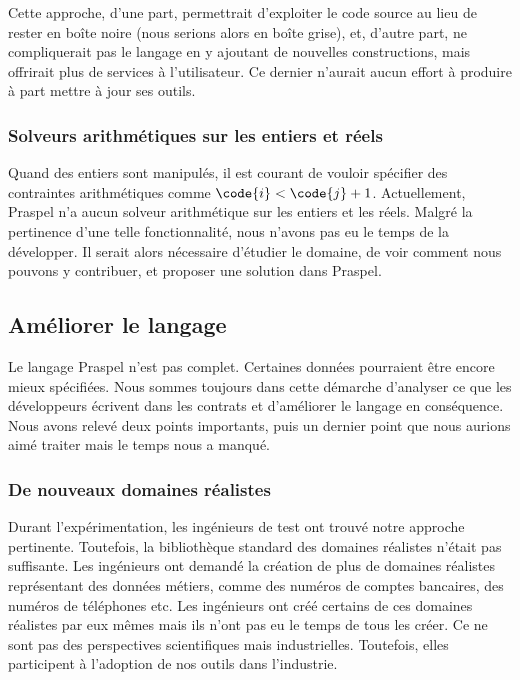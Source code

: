 Cette approche, d'une part, permettrait d'exploiter le code source au lieu de
rester en boîte noire (nous serions alors en boîte grise), et, d'autre part, ne
compliquerait pas le langage en y ajoutant de nouvelles constructions, mais
offrirait plus de services à l'utilisateur. Ce dernier n'aurait aucun effort à
produire à part mettre à jour ses outils.

\subsubsection{Solveurs arithmétiques sur les entiers et réels}

Quand des entiers sont manipulés, il est courant de vouloir spécifier des
contrain\-tes arithmétiques comme $\code{i} < \code{j} + 1$. Actuellement,
Praspel n'a aucun solveur arithmétique sur les entiers et les réels. Malgré la
pertinence d'une telle fonctionnalité, nous n'avons pas eu le temps de la
développer. Il serait alors nécessaire d'étudier le domaine, de voir comment
nous pouvons y contribuer, et proposer une solution dans Praspel.

\subsection{Améliorer le langage}

Le langage Praspel n'est pas complet. Certaines données pourraient être encore
mieux spécifiées. Nous sommes toujours dans cette démarche d'analyser ce que les
développeurs écrivent dans les contrats et d'améliorer le langage en
conséquence. Nous avons relevé deux points importants, puis un dernier point que
nous aurions aimé traiter mais le temps nous a manqué.

\subsubsection{De nouveaux domaines réalistes}

Durant l'expérimentation, les ingénieurs de test ont trouvé notre approche
pertinente. Toutefois, la bibliothèque standard des domaines réalistes n'était
pas suffisante. Les ingénieurs ont demandé la création de plus de domaines
réalistes représentant des données métiers, comme des numéros de comptes
bancaires, des numéros de téléphones etc. Les ingénieurs ont créé certains de
ces domaines réalistes par eux mêmes mais ils n'ont pas eu le temps de tous les
créer. Ce ne sont pas des perspectives scientifiques mais industrielles.
Toutefois, elles participent à l'adoption de nos outils dans l'industrie.

